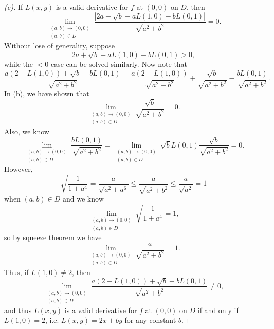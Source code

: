 \begin{proof}[(c)]
    If \(L(x, y)\) is a valid derivative for \(f\) at \((0, 0)\) on \(D\), then 
    \[
        \lim_{\substack{(a, b) \to (0, 0) \\ (a, b) \in D}} \frac{\left\vert 2a + \sqrt{b} - a L(1, 0) - bL(0, 1)  \right\vert }{\sqrt{a^2 + b^2} } = 0.
    \]    
    Without lose of generality, suppose 
    \[
        2a + \sqrt{b} - aL(1, 0) - bL(0, 1) > 0, 
    \]
    while the \(< 0\) case can be solved similarly. Now note that 
    \[
        \frac{a(2 - L(1, 0)) + \sqrt{b} - bL(0, 1)}{\sqrt{a^2 + b^2} } = \frac{a(2 - L(1, 0))}{\sqrt{a^2 + b^2}} + \frac{\sqrt{b} }{\sqrt{a^2 + b^2} } - \frac{b L(0, 1)}{\sqrt{a^2 + b^2} }.
    \] 
    In (b), we have shown that 
    \[
        \lim_{\substack{(a, b) \to (0, 0) \\ (a, b) \in D}} \frac{\sqrt{b} }{\sqrt{a^2 + b^2}} = 0.
    \]
    Also, we know 
    \[
        \lim_{\substack{(a, b) \to (0, 0) \\ (a, b) \in D}} \frac{b L(0, 1)}{\sqrt{a^2 + b^2} } = \lim_{\substack{(a, b) \to (0, 0) \\ (a, b) \in D}} \sqrt{b} L(0, 1) \frac{\sqrt{b} }{\sqrt{a^2 + b^2} } = 0. 
    \]
    However,
    \[
        \sqrt{\frac{1}{1 + a^4}} = \frac{a}{\sqrt{a^2 + a^6}} \le \frac{a}{\sqrt{a^2 + b^2} } \le \frac{a}{\sqrt{a^2} } = 1
    \]  
    when \((a, b) \in D\) and we know 
    \[
        \lim_{\substack{(a, b) \to (0, 0) \\ (a, b) \in D}} \sqrt{\frac{1}{1 + a^4}} = 1,  
    \] 
    so by squeeze theorem we have
    \[
        \lim_{\substack{(a, b) \to (0, 0) \\ (a, b) \in D}} \frac{a}{\sqrt{a^2 + b^2} } = 1.
    \]
    Thus, if \(L(1, 0) \neq 2\), then 
    \[
        \lim_{\substack{(a, b) \to (0, 0) \\ (a, b) \in D}} \frac{a(2 - L(1, 0)) + \sqrt{b} - bL(0, 1)}{\sqrt{a^2 + b^2} } \neq 0,
    \]
    and thus \(L(x, y)\) is a valid derivative for \(f\) at \((0, 0)\) on \(D\) if and only if \(L(1, 0) = 2\), i.e. \(L(x, y) = 2x + by\) for any constant \(b\). 
    
\end{proof}

